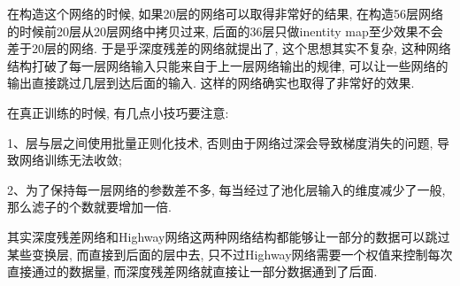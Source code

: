 在构造这个网络的时候, 如果20层的网络可以取得非常好的结果, 在构造56层网络的时候前20层从20层网络中拷贝过来, 后面的36层只做inentity map至少效果不会差于20层的网络.
于是乎深度残差的网络就提出了, 这个思想其实不复杂, 这种网络结构打破了每一层网络输入只能来自于上一层网络输出的规律, 可以让一些网络的输出直接跳过几层到达后面的输入.
这样的网络确实也取得了非常好的效果.
\begin{remark}
在真正训练的时候, 有几点小技巧要注意:

1、层与层之间使用批量正则化技术, 否则由于网络过深会导致梯度消失的问题, 导致网络训练无法收敛;

2、为了保持每一层网络的参数差不多, 每当经过了池化层输入的维度减少了一般, 那么滤子的个数就要增加一倍.

其实深度残差网络和Highway网络这两种网络结构都能够让一部分的数据可以跳过某些变换层, 而直接到后面的层中去, 只不过Highway网络需要一个权值来控制每次直接通过的数据量, 而深度残差网络就直接让一部分数据通到了后面.
\end{remark}
